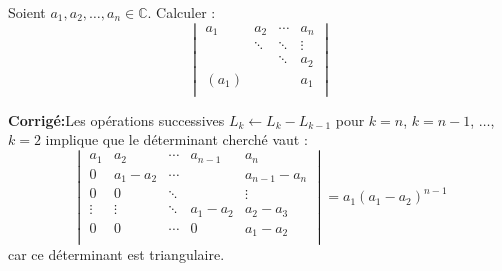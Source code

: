 \documentclass[a4paper,twoside,french,11pt]{VcCours}
\newcommand{\corr}{\textbf{Corrigé:}}
\begin{document}
\begin{Exercice}{} Soient $a_1 ,a_2 , \ldots ,a_n \in \mathbb{C}$. Calculer :
    \[
    \begin{vmatrix}
        {a_1} & {a_2} & \cdots & {a_n} \\
        {} & \ddots & \ddots & \vdots \\
        {} & {} & \ddots & {a_2} \\
        {(a_1)} & {} & {} & {a_1} \\
    \end{vmatrix}
    \]
\end{Exercice}

\corr Les opérations successives $L_k \leftarrow L_k - L_{k-1}$ pour $k=n$, $k=n-1$, $\ldots$, $k=2$ implique que le déterminant cherché vaut :
$$  \begin{vmatrix}
        {a_1} & {a_2} & \cdots & a_{n-1} & {a_n} \\
        0 &  a_1-a_2 & \cdots & & a_{n-1}-a_n \\
         0& 0& \ddots & & \vdots\\
        \vdots & \vdots & \ddots& a_1-a_2 & {a_2-a_3} \\
        0 & 0 & \cdots  & 0& {a_1-a_2} \\
    \end{vmatrix} = a_1 (a_1-a_2)^{n-1}$$
 car ce déterminant est triangulaire.
\end{document}
